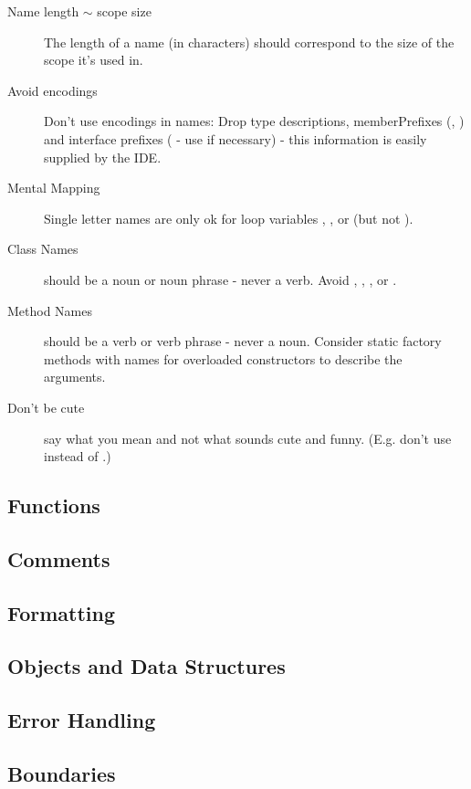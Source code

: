 \documentclass[a4paper, twocolumn]{article}
\newcommand{\code}[1]{\texttt{\color{black}{#1}}}
\begin{document}
\begin{description}
	\item[Name length $\sim$ scope size] The length of a name (in characters) should correspond to the size of the scope it's used in.
	\item[Avoid encodings] Don't use encodings in names: Drop type descriptions, memberPrefixes (\code{m...}, \code{m\_...}) and interface prefixes (\code{I...} - use \code{...Imp} if necessary) - this information is easily supplied by the IDE.
	\item[Mental Mapping] Single letter names are only ok for loop variables \code{i}, \code{j}, or \code{k} (but not \code{l}).
	\item[Class Names] should be a noun or noun phrase - never a verb. Avoid \code{Manager}, \code{Processor}, \code{Data}, or \code{Info}.
	\item[Method Names] should be a verb or verb phrase - never a noun. Consider static factory methods with names for overloaded constructors to describe the arguments.
	\item[Don't be cute] say what you mean and not what sounds cute and funny. (E.g. don't use \code{eatMyShorts} instead of \code{abort()}.)
\end{description}

\subsection{Functions}

\subsection{Comments}

\subsection{Formatting}

\subsection{Objects and Data Structures}

\subsection{Error Handling}

\subsection{Boundaries}
\end{document}
